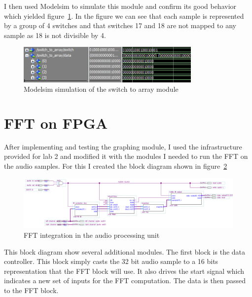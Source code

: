 \documentclass[letterpaper, titlepage, 11pt]{article}
\begin{document}


I then used Modelsim to simulate this module and confirm its good behavior which yielded figure~\ref{fig:switch_sim}. In the figure we can see that each sample is represented by a group of 4 switches and that switches 17 and 18 are not mapped to any sample as 18 is not divisible by 4.

\begin{figure}[!htb]
  \centering
  \includegraphics[width=0.8\textwidth]{switch_sim.PNG}
  \caption{Modelsim simulation of the switch to array module}
  \label{fig:switch_sim}
\end{figure}

\section{FFT on FPGA}

After implementing and testing the graphing module, I used the infrastructure provided for lab 2 and modified it with the modules I needed to run the FFT on the audio samples. For this I created the block diagram shown in figure~\ref{fig:block_filter}

\begin{figure}[!htb]
  \centering
  \includegraphics[width=\textwidth]{full_filter.PNG}
  \caption{FFT integration in the audio processing unit}
  \label{fig:block_filter}
\end{figure}

This block diagram show several additional modules. The first block is the data controller. This block simply casts the 32 bit audio sample to a 16 bits representation that the FFT block will use. It also drives the start signal which indicates a new set of inputs for the FFT computation. The data is then passed to the FFT block.


\end{document}
